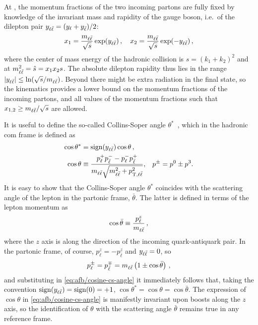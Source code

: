 At \lo, the momentum fractions of the two incoming partons are fully
fixed by knowledge of the invariant mass and rapidity of the gauge
boson, i.e.\ of the dilepton pair  $y_{\ell\bar{\ell}} = (y_\ell + y_{\bar{\ell}})/2$: 
\begin{equation}
  \label{eq:afb/x_fractions}
  x_1 = \frac{ m_{\ell\bar{\ell}}}{\sqrt{s}}\exp(y_{\ell\bar{\ell}}) \, ,\quad x_2 = \frac{
  m_{\ell\bar{\ell}}}{\sqrt{s}}\exp(-y_{\ell\bar{\ell}}) \, ,
\end{equation}
where the center of mass energy of the hadronic collision is
$s=(k_1+k_2)^2$ and at \lo
$m_{\ell\bar{\ell}}^2 = \hat s = x_1 x_2 s$. The absolute dilepton
rapidity thus lies in the range $|y_{\ell\bar{\ell}}|\le \ln (\sqrt{s}/m_{\ell\bar{\ell}})$.
Beyond \lo there might be extra radiation in the final state, so the \lo
kinematics provides a lower bound on the momentum fractions of the
incoming partons, and all values of the momentum
fractions such that $x_{1,2}\ge m_{\ell\bar{\ell}}/\sqrt s$ are allowed.

It is useful to define the so-called  Collins-Soper
angle $\theta^*$~\cite{Collins:1977iv}, which in the hadronic \acrfull{com}
frame is defined as
\begin{equation}
\begin{split}
  \cos\theta^* &= \operatorname{sign} (y_{\ell\bar{\ell}}) \cos\theta \, ,\\
  \cos\theta &\equiv\frac{p_\ell^+ p_{\bar{\ell}}^- - p_\ell^- p_{\bar{\ell}}^+}{m_{\ell\bar{\ell}} \sqrt{m_{\ell\bar{\ell}}^2 + p_{\mathrm{T},\ell\bar{\ell}}^2}} \text{,} \quad p^\pm = p^0 \pm p^3 \text{.}
  \label{eq:afb/cosine-cs-angle}
\end{split}
\end{equation}
It is easy to show that the Collins-Soper angle $\theta^*$ coincides with the
scattering angle of the lepton in the partonic \com frame, $\bar\theta$.
%
The latter is defined in terms of the lepton momentum as 
\begin{equation}
 \cos\bar\theta \equiv \frac{p^z_\ell}{m_{\ell\bar{\ell}}} \,, \label{eq:afb/coscm}
\end{equation}
where the $z$ axis is along the direction of the incoming quark-antiquark pair.
%
In the partonic \com frame, of course, $p^z_\ell=-p^z_{\bar \ell}$ and $y_{\ell\bar{\ell}}
=0$, so
\begin{equation}
p^\pm_\ell=p^{\mp}_{\bar{\ell}}=  m_{\ell\bar{\ell}} \left( 1\pm \cos{\bar\theta} \right)\, ,
\end{equation}
and substituting in \cref{eq:afb/cosine-cs-angle} it immediately follows that,
taking the convention 
$\operatorname{sign} (y_{\ell\bar{\ell}})=\operatorname{sign}(0)=+1$, 
$\cos\theta^*=\cos\theta=\cos{\bar\theta}$.
%
The expression of $\cos\theta$ in \cref{eq:afb/cosine-cs-angle} is manifestly
invariant upon boosts along the $z$ axis, so the identification of $\theta$
with the \com scattering angle $\bar\theta$ remains true in any reference
frame.

